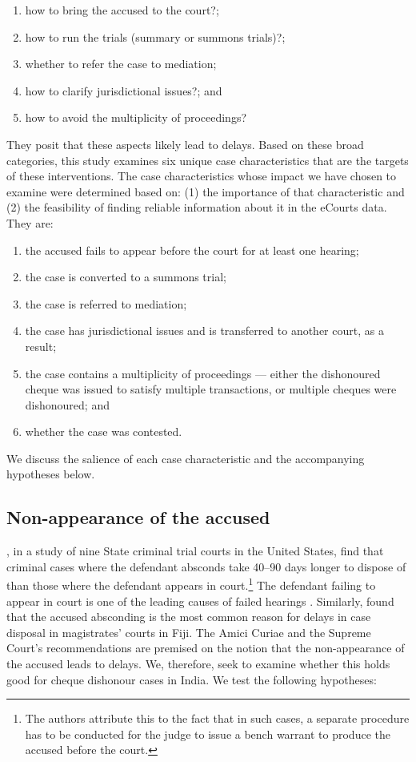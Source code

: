\documentclass[12pt,a4paper]{article}
\begin{document}
\begin{enumerate}
\item how to bring the accused to the court?;
\item how to run the trials (summary or summons trials)?;
\item whether to refer the case to mediation;
\item how to clarify jurisdictional issues?; and
\item how to avoid the multiplicity of proceedings?
\end{enumerate}

They posit that these aspects likely lead to delays. Based on these broad categories, this study examines six unique case characteristics that are the targets of these interventions. The case characteristics whose impact we have chosen to examine were determined based on: (1) the importance of that characteristic and (2) the feasibility of finding reliable information about it in the eCourts data. They are:

\begin{enumerate}
\item the accused fails to appear before the court for at least one hearing;
\item the case is converted to a summons trial;
\item the case is referred to mediation;
\item the case has jurisdictional issues and is transferred to another court, as a result;
\item the case contains a multiplicity of proceedings --- either the dishonoured cheque was issued to satisfy multiple transactions, or multiple cheques were dishonoured; and
\item whether the case was contested.
\end{enumerate}

We discuss the salience of each case characteristic and the accompanying hypotheses below.

\subsection{Non-appearance of the accused}
\label{sec:non-appe-accus}

\textcite{ostrom2000efficiency}, in a study of nine State criminal trial courts in the United States, find that criminal cases where the defendant absconds take 40--90 days longer to dispose of than those where the defendant appears in court.\footnote{The authors attribute this to the fact that in such cases, a separate procedure has to be conducted for the judge to issue a bench warrant to produce the accused before the court.} The defendant failing to appear in court is one of the leading causes of failed hearings \autocite{crownProsecutionService2006_magistrateCourtEfficiency}. Similarly, \textcite{llangasinghe1988_fijiJudicialDelays} found that the accused absconding is the most common reason for delays in case disposal in magistrates' courts in Fiji. The Amici Curiae and the Supreme Court's recommendations are premised on the notion that the non-appearance of the accused leads to delays. We, therefore, seek to examine whether this holds good for cheque dishonour cases in India. We test the following hypotheses:
\end{document}

